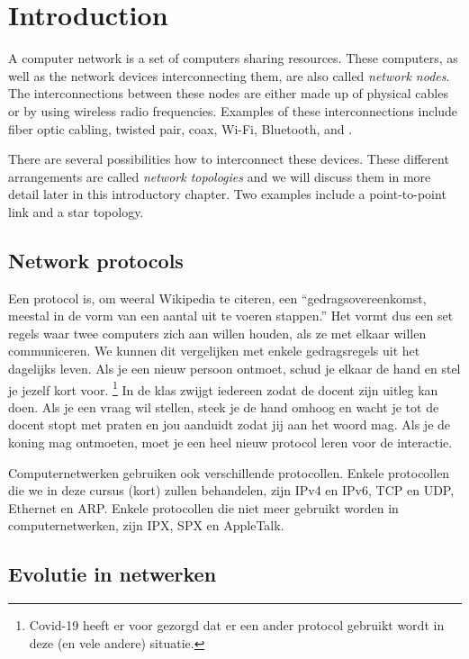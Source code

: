 \chapter{Introduction}

A computer network is a set of computers sharing resources.
These computers, as well as the network devices interconnecting them, are also called \emph{network nodes}.
The interconnections between these nodes are either made up of physical cables or by using wireless radio frequencies.
Examples of these interconnections include fiber optic cabling, twisted pair, coax, Wi-Fi, Bluetooth, and .

There are several possibilities how to interconnect these devices.
These different arrangements are called \emph{network topologies} and we will discuss them in more detail later in this introductory chapter.
Two examples include a point-to-point link and a star topology.


\section{Network protocols}

Een protocol is, om weeral Wikipedia te citeren, een ``gedragsovereenkomst, meestal in de vorm van een aantal uit te voeren stappen.''
Het vormt dus een set regels waar twee computers zich aan willen houden, als ze met elkaar willen communiceren.
We kunnen dit vergelijken met enkele gedragsregels uit het dagelijks leven.
Als je een nieuw persoon ontmoet, schud je elkaar de hand en stel je jezelf kort voor.%
  \footnote{Covid-19 heeft er voor gezorgd dat er een ander protocol gebruikt wordt in deze (en vele andere) situatie.}
In de klas zwijgt iedereen zodat de docent zijn uitleg kan doen.
Als je een vraag wil stellen, steek je de hand omhoog en wacht je tot de docent stopt met praten en jou aanduidt zodat jij aan het woord mag.
Als je de koning mag ontmoeten, moet je een heel nieuw protocol leren voor de interactie.

Computernetwerken gebruiken ook verschillende protocollen.
Enkele protocollen die we in deze cursus (kort) zullen behandelen, zijn
IPv4 en IPv6, TCP en UDP, Ethernet en ARP.
Enkele protocollen die niet meer gebruikt worden in computernetwerken, zijn IPX, SPX en AppleTalk.



\section{Evolutie in netwerken}

